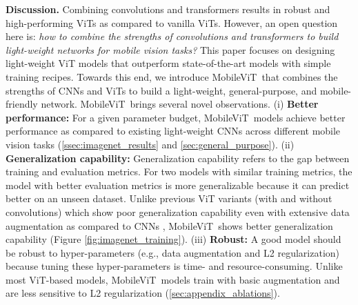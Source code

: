 \documentclass[preprint]{article} \usepackage{iclr2022_conference,times}
\newcommand{\arch}{MobileViT}
\begin{document}
\textbf{Discussion.} Combining convolutions and transformers results in robust and high-performing ViTs as compared to vanilla ViTs. However, an open question here is: \emph{how to  combine the strengths of convolutions and transformers to build light-weight networks for mobile vision tasks?} This paper focuses on designing light-weight ViT models that outperform state-of-the-art models with simple training recipes. Towards this end, we introduce \arch~that combines the strengths of CNNs and ViTs to build a light-weight, general-purpose, and mobile-friendly network. \arch~brings several novel observations. (i) \textbf{Better performance:} For a given parameter budget, \arch~models achieve better performance as compared to existing light-weight CNNs across different mobile vision tasks (\textsection \ref{ssec:imagenet_results} and \textsection \ref{sec:general_purpose}). (ii) \textbf{Generalization capability:} Generalization capability refers to the gap between training and evaluation metrics. For two models with similar training metrics, the model with better evaluation metrics is more generalizable because it can predict better on an unseen dataset. Unlike previous ViT variants (with and without convolutions) which show poor generalization capability even with extensive data augmentation as compared to CNNs \citep{dai2021coatnet}, \arch~shows better generalization capability (Figure \ref{fig:imagenet_training}). (iii) \textbf{Robust:} A good model should be robust to hyper-parameters (e.g., data augmentation and L2 regularization) because tuning these hyper-parameters is time- and resource-consuming.  Unlike most ViT-based models, \arch~models train with basic augmentation and are less sensitive to L2 regularization (\textsection \ref{sec:appendix_ablations}).
\end{document}
